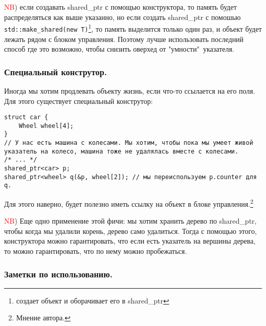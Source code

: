 \textcolor{red}{NB}) если создавать shared\_ptr с помощью конструктора, то память будет распределяться как выше указанно, но если создать shared\_ptr с помошью \texttt{std::make_shared(new T)}\footnote{создает объект и оборачивает его в shared\_ptr}, то память выделится только один раз, и объект будет лежать рядом с блоком управления. Поэтому лучше использовать последний способ где это возможно, чтобы снизить оверхед от "умности"\ указателя.

\subsubsection{Специальный конструтор.}
Иногда мы хотим продлевать объекту жизнь, если что-то ссылается на его поля. Для этого существует специальный конструтор:

\begin{verbatim}
struct car {
    Wheel wheel[4];
}
// У нас есть машина с колесами. Мы хотим, чтобы пока мы умеет живой указатель на колесо, машина тоже не удалялась вместе с колесами.
/* ... */
shared_ptr<car> p;
shared_ptr<wheel> q(&p, wheel[2]); // мы переиспользуем p.counter для q.

\end{verbatim}
Для этого наверно, будет полезно иметь ссылку на объект в блоке управления.\footnote{Мнение автора.}


\textcolor{red}{NB}) Еще одно применение этой фичи: мы хотим хранить дерево по shared\_ptr, чтобы когда мы удалили корень, дерево само удалиться. Тогда с помощью этого, конструктора можно гарантировать, что если есть указатель на вершины дерева, то можно гарантировать, что по нему можно пробежаться.

\subsubsection{Заметки по использованию.}

